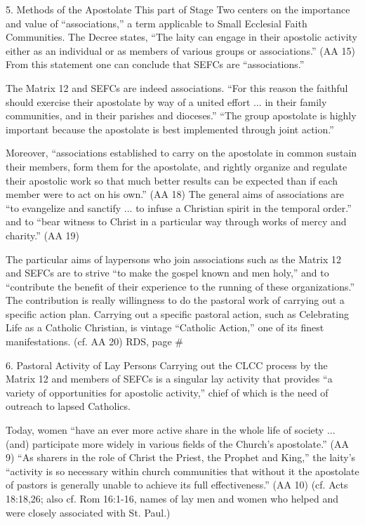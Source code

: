 \documentclass[oneside]{book}
\begin{document}
5. Methods of the Apostolate
This part of Stage Two centers on the importance and value of ``associations,''
a term applicable to Small Ecclesial Faith Communities. The Decree states, ``The
laity can engage in their apostolic activity either as an individual or as
members of various groups or associations.'' (AA 15) From this statement one can
conclude that SEFCs are ``associations.''

The Matrix 12 and SEFCs are indeed associations. ``For this reason the faithful
should exercise their apostolate by way of a united effort ... in their family
communities, and in their parishes and dioceses.'' ``The group apostolate is
highly important because the apostolate is best implemented through joint
action.''

Moreover, ``associations established to carry on the apostolate in common
sustain their members, form them for the apostolate, and rightly organize and
regulate their apostolic work so that much better results can be expected than
if each member were to act on his own.'' (AA 18)
The general aims of associations are ``to evangelize and sanctify ... to infuse
a Christian spirit in the temporal order.'' and to ``bear witness to Christ in a
particular way through works of mercy and charity.'' (AA 19)

The particular aims of laypersons who join associations such as the Matrix 12
and SEFCs are to strive ``to make the gospel known and men holy,'' and to
``contribute the benefit of their experience to the running of these
organizations.'' The contribution is really willingness to do the pastoral work
of carrying out a specific action plan. Carrying out a specific pastoral action,
such as Celebrating Life as a Catholic Christian, is vintage ``Catholic
Action,'' one of its finest manifestations. (cf. AA 20)
RDS, page \#

6. Pastoral Activity of Lay Persons
Carrying out the CLCC process by the Matrix 12 and members of SEFCs is a
singular lay activity that provides ``a variety of opportunities for apostolic
activity,'' chief of which is the need of outreach to lapsed Catholics.

Today, women ``have an ever more active share in the whole life of society
... (and) participate more widely in various fields of the Church's
apostolate.'' (AA 9) ``As sharers in the role of Christ the Priest, the Prophet
and King,'' the laity's ``activity is so necessary within church communities
that without it the apostolate of pastors is generally unable to achieve its
full effectiveness.'' (AA 10) (cf. Acts 18:18,26; also cf. Rom 16:1-16, names of
lay men and women who helped and were closely associated with St. Paul.)
\end{document}
